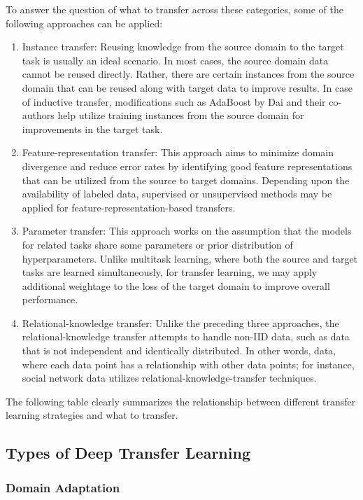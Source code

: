 To answer the question of what to transfer across these categories, some of the following approaches can be applied:

\begin{enumerate}
    \item Instance transfer: Reusing knowledge from the source domain to the target task is usually an ideal scenario. In most cases, the source domain data cannot be reused directly. Rather, there are certain instances from the source domain that can be reused along with target data to improve results. In case of inductive transfer, modifications such as AdaBoost by Dai and their co-authors help utilize training instances from the source domain for improvements in the target task.
    \item Feature-representation transfer: This approach aims to minimize domain divergence and reduce error rates by identifying good feature representations that can be utilized from the source to target domains. Depending upon the availability of labeled data, supervised or unsupervised methods may be applied for feature-representation-based transfers.
    \item Parameter transfer: This approach works on the assumption that the models for related tasks share some parameters or prior distribution of hyperparameters. Unlike multitask learning, where both the source and target tasks are learned simultaneously, for transfer learning, we may apply additional weightage to the loss of the target domain to improve overall performance.
    \item Relational-knowledge transfer: Unlike the preceding three approaches, the relational-knowledge transfer attempts to handle non-IID data, such as data that is not independent and identically distributed. In other words, data, where each data point has a relationship with other data points; for instance, social network data utilizes relational-knowledge-transfer techniques.
\end{enumerate}

The following table clearly summarizes the relationship between different transfer learning strategies and what to transfer.

\subsection{Types of Deep Transfer Learning}

\subsubsection{Domain Adaptation}
